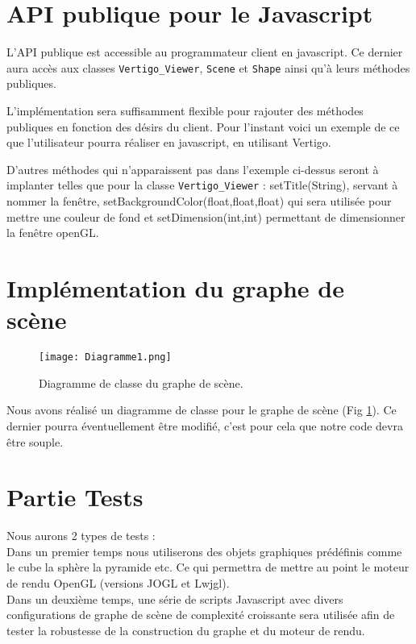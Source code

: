 \documentclass[11pt]{report}
\begin{document}
\section{API publique pour le Javascript} 
L'API publique est accessible au programmateur client en javascript.
Ce dernier aura accès aux classes \texttt{Vertigo\_Viewer}, \texttt{Scene} et \texttt{Shape}  ainsi qu'à leurs méthodes publiques.

L'implémentation sera suffisamment flexible pour rajouter des méthodes publiques en fonction des désirs du client. 
Pour l'instant voici un exemple de ce que l'utilisateur pourra réaliser en javascript, en utilisant Vertigo. 

 


D'autres méthodes qui n'apparaissent pas dans l'exemple ci-dessus seront à implanter telles que pour la classe \texttt{Vertigo\_Viewer} : setTitle(String), servant à nommer la fenêtre, setBackgroundColor(float,float,float) qui sera utilisée pour mettre une couleur de fond et setDimension(int,int) permettant de dimensionner la fenêtre openGL.



\section{Implémentation du graphe de scène}

\begin{figure}[h!]
  \caption{Diagramme de classe du graphe de scène.}
  \label{diagrammeClasse}
  \centering
    \texttt{[image: Diagramme1.png]}
\end{figure}

Nous avons réalisé un diagramme de classe pour le graphe de scène (Fig \ref{diagrammeClasse}). Ce dernier pourra éventuellement être modifié, c'est pour cela que notre code devra être souple.


\section{Partie Tests}
Nous aurons 2 types de tests :\\
 
Dans un premier temps nous utiliserons des objets graphiques prédéfinis comme le cube la sphère la pyramide etc. Ce qui permettra de mettre au point le moteur de rendu OpenGL (versions JOGL et Lwjgl). \\

Dans un deuxième temps, une série de scripts Javascript avec divers configurations de graphe de scène de complexité croissante sera utilisée afin de tester la robustesse de la construction du graphe et du moteur de rendu. \\
\end{document}
